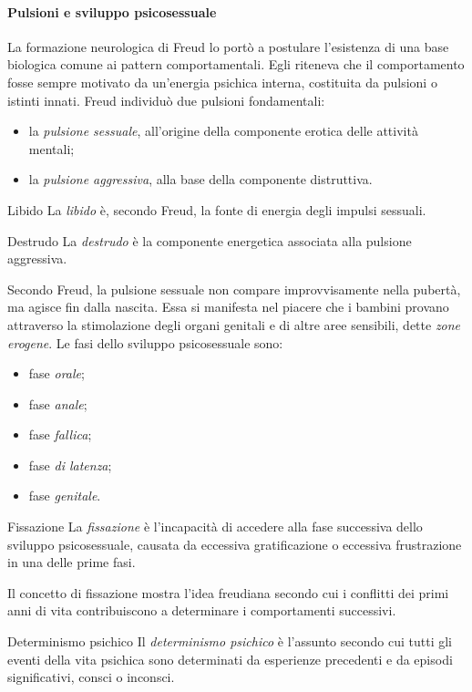 \documentclass[a4paper]{article}
\begin{document}
\paragraph{Pulsioni e sviluppo psicosessuale}
La formazione neurologica di Freud lo portò a postulare l'esistenza di una base biologica comune ai pattern comportamentali. Egli riteneva che il comportamento fosse sempre motivato da un'energia psichica interna, costituita da pulsioni o istinti innati.
Freud individuò due pulsioni fondamentali:
\begin{itemize}
    \item la \emph{pulsione sessuale}, all'origine della componente erotica delle attività mentali;
    \item la \emph{pulsione aggressiva}, alla base della componente distruttiva.
\end{itemize}
\begin{snippetdefinition}{Libido}
    La \emph{libido} è, secondo Freud, la fonte di energia degli impulsi sessuali.
\end{snippetdefinition}
\begin{snippetdefinition}{Destrudo}
    La \emph{destrudo} è la componente energetica associata alla pulsione aggressiva.
\end{snippetdefinition}
Secondo Freud, la pulsione sessuale non compare improvvisamente nella pubertà, ma agisce fin dalla nascita. Essa si manifesta nel piacere che i bambini provano attraverso la stimolazione degli organi genitali e di altre aree sensibili, dette \emph{zone erogene}.
Le fasi dello sviluppo psicosessuale sono:
\begin{itemize}
    \item fase \emph{orale};
    \item fase \emph{anale};
    \item fase \emph{fallica};
    \item fase \emph{di latenza};
    \item fase \emph{genitale}.
\end{itemize}
\begin{snippetdefinition}{Fissazione}
    La \emph{fissazione} è l'incapacità di accedere alla fase successiva dello sviluppo psicosessuale, causata da eccessiva gratificazione o eccessiva frustrazione in una delle prime fasi.
\end{snippetdefinition}
Il concetto di fissazione mostra l'idea freudiana secondo cui i conflitti dei primi anni di vita contribuiscono a determinare i comportamenti successivi.
\begin{snippetdefinition}{Determinismo psichico}
    Il \emph{determinismo psichico} è l'assunto secondo cui tutti gli eventi della vita psichica sono determinati da esperienze precedenti e da episodi significativi, consci o inconsci.
\end{snippetdefinition}
\end{document}
